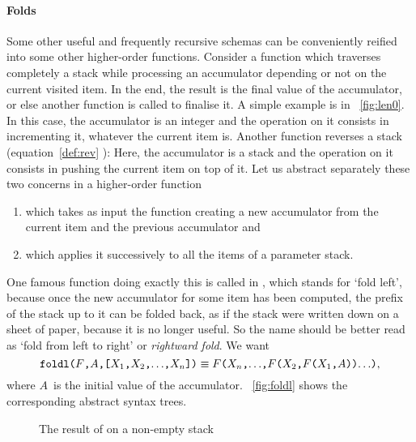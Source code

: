 \paragraph{Folds}
\label{par:folds}

Some other useful and frequently recursive schemas can be conveniently
reified into some other higher\hyp{}order functions. Consider a
function which traverses completely a stack while processing an
accumulator depending or not on the current visited item. In the end,
the result is the final value of the accumulator, or else another
function is called to finalise it. A simple example is  in
\fig~\vref{fig:len0}. In this case, the accumulator is an integer and
the operation on it consists in incrementing it, whatever the current
item is. Another function reverses a stack (equation~\eqref{def:rev}
):  Here, the accumulator is
a stack and the operation on it consists in pushing the current item
on top of it. Let us abstract separately these two concerns in a
higher\hyp{}order function
\begin{enumerate}

  \item which takes as input the function creating a new accumulator
    from the current item and the previous accumulator and

  \item which applies it successively to all the items of a parameter
    stack.

\end{enumerate}
One famous function doing exactly this is called  in
\Erlang, which stands for `fold left', because once the new
accumulator for some item has been computed, the prefix of the stack
up to it can be folded back, as if the stack were written down on a
sheet of paper, because it is no longer useful. So the name should be
better read as `fold from left to right' or \emph{rightward fold}. We
want
\begin{equation*}
\texttt{foldl(\(F\),\(A\),[\(X_1\),\(X_2\),\(\ldots\),\(X_{n}\)])}
\equiv
\texttt{\(F\)(\(X_{n}\),\(\ldots\),\(F\)(\(X_2\),\(F\)(\(X_1\),\(A\)))\(\ldots\))},
\end{equation*}
where \(A\)~is the initial value of the
accumulator. \Fig~\vref{fig:foldl} shows the corresponding abstract
syntax trees.
\begin{figure}[b]
\centering
{}
\qquad
{}
\caption{The result of  on a non\hyp{}empty stack}
\label{fig:foldl}
\end{figure}

